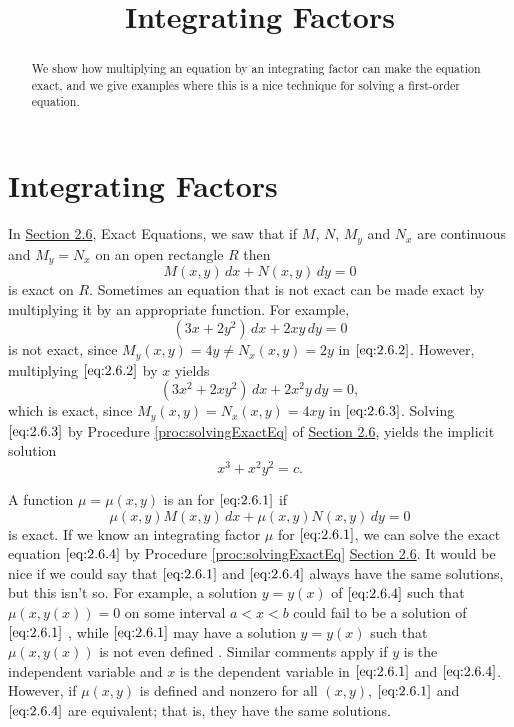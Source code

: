 \documentclass{ximera}
\title{Integrating Factors}
\begin{document}
\begin{abstract}
We show how multiplying an equation by an integrating factor can make the equation exact, and we give examples where this is a nice technique for solving a first-order equation.
\end{abstract}

\maketitle



\section*{Integrating Factors}
In \href{https://xerxes.ximera.org/differentialequations/main/exactEquations/exactEquations}{Section 2.6}, Exact Equations, we saw that if $M$, $N$, $M_y$ and $N_x$ are
continuous and $M_y=N_x$ on an open rectangle $R$ then
\begin{equation} \label{eq:2.6.1}
M(x,y)\,dx+N(x,y)\,dy=0
\end{equation}
is exact on $R$. Sometimes an equation that is not exact can be made exact by multiplying it by an appropriate function. For example,
\begin{equation}\label{eq:2.6.2}
(3x+2y^2)\,dx+2xy\,dy=0
\end{equation}
is  not exact, since
$M_y(x,y)=4y\neq  N_x(x,y)=2y$ in $\eqref{eq:2.6.2}$.
 However, multiplying $\eqref{eq:2.6.2}$  by $x$ yields
\begin{equation}\label{eq:2.6.3}
(3x^2+2xy^2)\,dx+2x^2y\,dy=0,
\end{equation}
which is exact, since
$M_y(x,y)=N_x(x,y)=4xy$ in $\eqref{eq:2.6.3}$.
Solving $\eqref{eq:2.6.3}$ by Procedure \ref{proc:solvingExactEq} of \href{https://xerxes.ximera.org/differentialequations/main/exactEquations/exactEquations}{Section 2.6},
 yields the implicit solution
$$
x^3+x^2y^2=c.
$$

A function $\mu=\mu(x,y)$ is  an  for
$\eqref{eq:2.6.1}$  if
\begin{equation}\label{eq:2.6.4}
 \mu(x,y)M (x,y)\,dx+\mu(x,y)N (x,y)\,dy=0
 \end{equation}
 is exact. If we know an integrating
factor $\mu$ for $\eqref{eq:2.6.1}$, we can solve the exact equation
$\eqref{eq:2.6.4}$ by Procedure \ref{proc:solvingExactEq} \href{https://xerxes.ximera.org/differentialequations/main/exactEquations/exactEquations}{Section 2.6}. It would be
nice if we could say that $\eqref{eq:2.6.1}$ and $\eqref{eq:2.6.4}$ always have the
same solutions, but this isn't so. For example, a solution
$y=y(x)$ of $\eqref{eq:2.6.4}$ such that $\mu(x,y(x))=0$ on some interval
$a<x<b$ could fail to be a solution of $\eqref{eq:2.6.1}$
, while
$\eqref{eq:2.6.1}$ may have a solution $y=y(x)$ such that $\mu(x,y(x))$
is not even defined 
. Similar comments
apply if $y$ is the independent variable and $x$ is the dependent
variable in $\eqref{eq:2.6.1}$ and $\eqref{eq:2.6.4}$.  However, if $\mu(x,y)$
is defined and nonzero for all $(x,y)$, $\eqref{eq:2.6.1}$ and
$\eqref{eq:2.6.4}$ are equivalent; that is, they have the same solutions.
\end{document}
